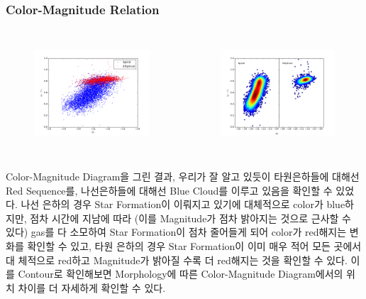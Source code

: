 \documentclass[xcolor={dvipsnames,table}]{beamer}
\newcommand\SSM{\fontsize{7}{7.2}\selectfont}
\begin{document}
\begin{frame}
 \frametitle{Color-Magnitude Relation}
 \SSM
 \begin{columns}[t]
   \begin{figure}
    \centering
    \includegraphics[width=6cm, height=4cm]{colormag.png}
   \end{figure}
   \begin{figure}
    \centering
    \includegraphics[width=6cm, height=4cm]{colormagdensity.png}
   \end{figure}
  \end{columns}
\vspace{0.3cm}
Color-Magnitude Diagram을 그린 결과, 우리가 잘 알고 있듯이 타원은하들에 대해선 Red Sequence를, 나선은하들에 대해선
Blue Cloud를 이루고 있음을 확인할 수 있었다. 나선 은하의 경우 Star Formation이 이뤄지고 있기에 대체적으로 color가 blue하
지만, 점차 시간에 지남에 따라 (이를 Magnitude가 점차 밝아지는 것으로 근사할 수 있다) gas를 다 소모하여 Star Formation이
점차 줄어들게 되어 color가 red해지는 변화를 확인할 수 있고, 타원 은하의 경우 Star Formation이 이미 매우 적어 모든 곳에서 대
체적으로 red하고 Magnitude가 밝아질 수록 더 red해지는 것을 확인할 수 있다.
이를 Contour로 확인해보면 Morphology에 따른 Color-Magnitude Diagram에서의 위치 차이를 더 자세하게 확인할 수 있다.
 
\end{frame}
\end{document}
